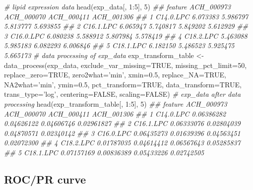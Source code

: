\documentclass[]{article}
\newcommand{\hlnum}[1]{\textcolor[rgb]{0.816,0.125,0.439}{#1}}%
\newcommand{\hlstr}[1]{\textcolor[rgb]{0.251,0.627,0.251}{#1}}%
\newcommand{\hlcom}[1]{\textcolor[rgb]{0.502,0.502,0.502}{\textit{#1}}}%
\newcommand{\hlopt}[1]{\textcolor[rgb]{0,0,0}{#1}}%
\newcommand{\hlstd}[1]{\textcolor[rgb]{0.251,0.251,0.251}{#1}}%
\newcommand{\hlkwc}[1]{\textcolor[rgb]{0.251,0.251,0.251}{#1}}%
\newcommand{\hlkwd}[1]{\textcolor[rgb]{0.878,0.439,0.125}{#1}}%
\newenvironment{Shaded}{\begin{myshaded}}{\end{myshaded}}
\newcommand{\KeywordTok}[1]{\hlkwd{#1}}
\newcommand{\DataTypeTok}[1]{\hlkwc{#1}}
\newcommand{\DecValTok}[1]{\hlnum{#1}}
\newcommand{\FloatTok}[1]{\hlnum{#1}}
\newcommand{\StringTok}[1]{\hlstr{#1}}
\newcommand{\CommentTok}[1]{\hlcom{#1}}
\newcommand{\OtherTok}[1]{{#1}}
\newcommand{\OperatorTok}[1]{\hlopt{#1}}
\newcommand{\NormalTok}[1]{\hlstd{#1}}
\begin{document}
\begin{Shaded}
\begin{Highlighting}[]
\CommentTok{# lipid expression data}
\KeywordTok{head}\NormalTok{(exp_data[, }\DecValTok{1}\OperatorTok{:}\DecValTok{5}\NormalTok{], }\DecValTok{5}\NormalTok{)}
\CommentTok{##     feature ACH_000973 ACH_000070 ACH_000411 ACH_001306}
\CommentTok{## 1 C14.0.LPC   6.073383   5.986797   5.813777   5.693855}
\CommentTok{## 2 C16.1.LPC   6.065947   5.740817   5.849202   5.612929}
\CommentTok{## 3 C16.0.LPC   6.080238   5.588912   5.807984   5.578419}
\CommentTok{## 4 C18.2.LPC   5.463088   5.985183   6.082293   6.006846}
\CommentTok{## 5 C18.1.LPC   6.182150   5.486523   5.925475   5.665173}
\CommentTok{# data processing of exp_data}
\NormalTok{exp_transform_table <-}\StringTok{ }\KeywordTok{data_process}\NormalTok{(exp_data, }\DataTypeTok{exclude_var_missing=}\OtherTok{TRUE}\NormalTok{,}
                                    \DataTypeTok{missing_pct_limit=}\DecValTok{50}\NormalTok{, }\DataTypeTok{replace_zero=}\OtherTok{TRUE}\NormalTok{,}
                                    \DataTypeTok{zero2what=}\StringTok{'min'}\NormalTok{, }\DataTypeTok{xmin=}\FloatTok{0.5}\NormalTok{, }\DataTypeTok{replace_NA=}\OtherTok{TRUE}\NormalTok{,}
                                    \DataTypeTok{NA2what=}\StringTok{'min'}\NormalTok{, }\DataTypeTok{ymin=}\FloatTok{0.5}\NormalTok{, }
                                    \DataTypeTok{pct_transform=}\OtherTok{TRUE}\NormalTok{,}
                                    \DataTypeTok{data_transform=}\OtherTok{TRUE}\NormalTok{, }\DataTypeTok{trans_type=}\StringTok{'log'}\NormalTok{,}
                                    \DataTypeTok{centering=}\OtherTok{FALSE}\NormalTok{, }\DataTypeTok{scaling=}\OtherTok{FALSE}\NormalTok{)}
\CommentTok{# exp_data after data processing}
\KeywordTok{head}\NormalTok{(exp_transform_table[, }\DecValTok{1}\OperatorTok{:}\DecValTok{5}\NormalTok{], }\DecValTok{5}\NormalTok{)}
\CommentTok{##     feature ACH_000973 ACH_000070 ACH_000411 ACH_001306}
\CommentTok{## 1 C14.0.LPC 0.06386282 0.04626122 0.04606746 0.02961827}
\CommentTok{## 2 C16.1.LPC 0.06333076 0.02804039 0.04870571 0.02340142}
\CommentTok{## 3 C16.0.LPC 0.06435273 0.01639396 0.04563451 0.02072300}
\CommentTok{## 4 C18.2.LPC 0.01787035 0.04614412 0.06567643 0.05285837}
\CommentTok{## 5 C18.1.LPC 0.07157169 0.00836389 0.05433226 0.02742505}
\end{Highlighting}
\end{Shaded}

\hypertarget{rocpr-curve}{%
\subsection{ROC/PR curve}\label{rocpr-curve}}
\end{document}
